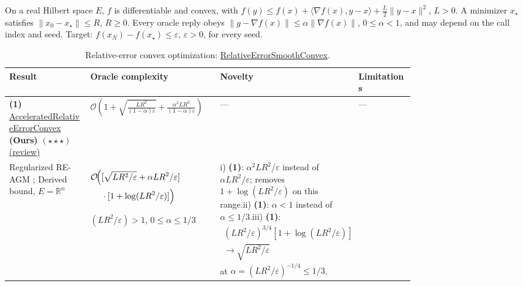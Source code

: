 \begin{table}[tp]
\centering
\caption{Relative-error convex optimization: \href{https://github.com/k3nfalt/longtails/blob/main/LongTails/Setups/RelativeErrorSmoothConvex.lean}{Relative\allowbreak{}Error\allowbreak{}Smooth\allowbreak{}Convex}.}\label{tab:RelativeErrorSmoothConvex}
\parbox{\linewidth}{\footnotesize On a real Hilbert space $E$, $f$ is differentiable and convex, with $f(y)\le f(x)+\langle\nabla f(x),y-x\rangle+\frac L2\|y-x\|^2$, $L>0$. A minimizer $x_\star$ satisfies $\|x_0-x_\star\|\le R$, $R\ge0$. Every oracle reply obeys $\|g-\nabla f(x)\|\le\alpha\|\nabla f(x)\|$, $0\le\alpha<1$, and may depend on the call index and seed. Target: $f(x_N)-f(x_\star)\le\varepsilon$, $\varepsilon>0$, for every seed.}\par\smallskip
\begin{threeparttable}
\footnotesize
\setlength{\tabcolsep}{4pt}\renewcommand{\arraystretch}{1.25}
\begin{tabularx}{\linewidth}{@{}>{\raggedright\arraybackslash}p{0.20\linewidth}>{\raggedright\arraybackslash}p{0.32\linewidth}>{\raggedright\arraybackslash}p{0.25\linewidth}>{\raggedright\arraybackslash}X@{}}
\toprule
\textbf{Result} & \textbf{Oracle complexity} & \textbf{Novelty} & \textbf{Limitations} \\
\midrule
\textbf{(1)} \href{https://github.com/k3nfalt/longtails/blob/main/LongTails/Theorems/AcceleratedRelativeErrorConvex.lean}{Accelerated\allowbreak{}Relative\allowbreak{}Error\allowbreak{}Convex} \textbf{(Ours)} $(\star\star\star)$ \href{https://github.com/k3nfalt/longtails/blob/main/scripts/reviews/AcceleratedRelativeErrorConvex.md}{(review)}
& $\mathcal{O}\!\left(1+\sqrt{\frac{LR^2}{(1-\alpha)\varepsilon}}+\frac{\alpha^2LR^2}{(1-\alpha)\varepsilon}\right)$
& ---
& --- \\
\midrule[1.2pt]
Regularized RE-AGM \citep[Thm.~7.2, v1]{vasinGasnikov2026RelativeV1}; Derived bound, $E=\mathbb{R}^n$
& $\begin{aligned}\mathcal{O}\!\Bigl(&[\sqrt{LR^2/\varepsilon}+\alpha LR^2/\varepsilon]\\&\cdot[1+\log(LR^2/\varepsilon)]\Bigr)\end{aligned}$\par $(LR^2/\varepsilon)>1$, $0\le\alpha\le1/3$
& i) \textbf{(1)}: $\alpha^2LR^2/\varepsilon$ instead of $\alpha LR^2/\varepsilon$; removes $1+\log (LR^2/\varepsilon)$ on this range.\newline ii) \textbf{(1)}: $\alpha<1$ instead of $\alpha\le1/3$.\newline iii) \textbf{(1)}: $\begin{gathered}(LR^2/\varepsilon)^{3/4}[1+\log(LR^2/\varepsilon)]\\{}\to\sqrt{LR^2/\varepsilon}\end{gathered}$ at $\alpha=(LR^2/\varepsilon)^{-1/4}\le1/3$.

\end{tabularx}
\end{threeparttable}
\end{table}
